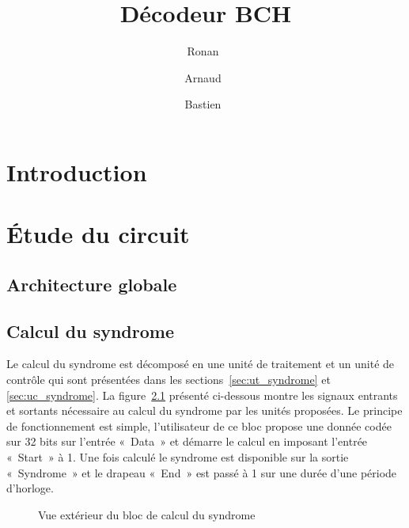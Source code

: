 \documentclass[a4paper, 11pt, svgnames]{report}
\title{Décodeur BCH}
\author{Ronan~\bsc{Le Guillou} \and Arnaud~\bsc{Levaufre} \and Bastien~\bsc{Orivel}}
\begin{document}
    \maketitle
    \tableofcontents
    \printglossaries
    \listoffigures
    \listoftables

    \chapter{Introduction}

    \chapter{Étude du circuit}
        \section{Architecture globale}


        \section{Calcul du syndrome}
            Le calcul du syndrome est décomposé en une unité de traitement et
            un unité de contrôle qui sont présentées dans les
            sections~\ref{sec:ut_syndrome} et \ref{sec:uc_syndrome}. La
            figure~\ref{fig:syndrome} présenté ci-dessous montre les signaux
            entrants et sortants nécessaire au calcul du syndrome par les
            unités proposées. Le principe de fonctionnement est simple,
            l'utilisateur de ce bloc propose une donnée codée sur 32 bits sur
            l'entrée «~Data~» et démarre le calcul en imposant l'entrée
            «~Start~» à 1.  Une fois calculé le syndrome est disponible sur la
            sortie «~Syndrome~» et le drapeau «~End~» est passé à 1 sur une durée
            d'une période d'horloge.

            \begin{figure}[H]
                \centering
                \caption{Vue extérieur du bloc de calcul du syndrome}
                \label{fig:syndrome}
            \end{figure}
\end{document}
